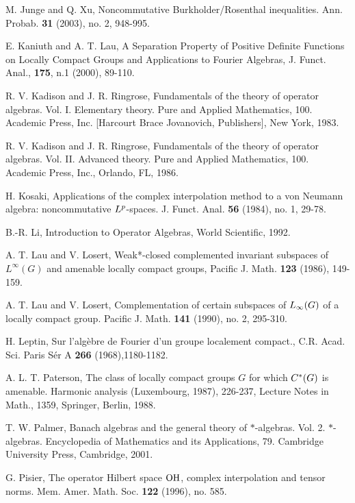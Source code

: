 \documentclass[10pt]{amsart}
\numberwithin{thm}{section}
\numberwithin{equation}{section}
\begin{document}
\begin{thebibliography}{1}
M. Junge and Q. Xu, Noncommutative Burkholder/Rosenthal inequalities. Ann. Probab. \textbf{31} (2003), no. 2, 948-995.

 E. Kaniuth and  A. T. Lau,
A Separation Property of Positive Definite Functions on Locally Compact Groups and Applications to Fourier Algebras,
J. Funct. Anal., \textbf{175}, n.1 (2000), 89-110.

R. V. Kadison and J. R. Ringrose, Fundamentals of the theory of operator algebras. Vol. I. Elementary theory. Pure and Applied Mathematics, 100. 
Academic Press, Inc. [Harcourt Brace Jovanovich, Publishers], New York, 1983.

R. V. Kadison and J. R. Ringrose, Fundamentals of the theory of operator algebras. Vol. II. Advanced theory. Pure and Applied Mathematics, 100.
Academic Press, Inc., Orlando, FL, 1986.

H. Kosaki, Applications of the complex interpolation method to a von Neumann algebra: noncommutative $L\sp{p}$-spaces.
J. Funct. Anal. \textbf{56} (1984), no. 1, 29-78.

B.-R. Li, Introduction to Operator Algebras, World Scientific, 1992.

A. T. Lau and V. Losert,
Weak*-closed complemented invariant subspaces of $L^\infty(G)$ and amenable locally compact groups, Pacific J. Math. \textbf{123} (1986), 149-159.

A. T. Lau and V. Losert,
Complementation of certain subspaces of $L\sb \infty(G)$ of a locally compact group.  Pacific J. Math. \textbf{141} (1990),  no. 2, 295-310.

  H. Leptin, Sur l'alg\`{e}bre de Fourier d'un groupe
localement compact., C.R. Acad. Sci. Paris S\'{e}r A \textbf{266 }(1968),1180-1182.

A. L. T. Paterson, The class of locally compact groups $G$ for which $C\sp *(G)$ is amenable.
Harmonic analysis (Luxembourg, 1987),  226-237, Lecture Notes in Math., 1359, Springer, Berlin, 1988.

T. W. Palmer, Banach algebras and the general theory of $*$-algebras. Vol. 2. $*$-algebras.
Encyclopedia of Mathematics and its Applications, 79. Cambridge University Press, Cambridge, 2001.

G. Pisier, The operator Hilbert space ${\rm OH}$, complex interpolation and tensor norms. Mem. Amer. Math. Soc. \textbf{122} (1996), no. 585.


\end{thebibliography}
\end{document}
